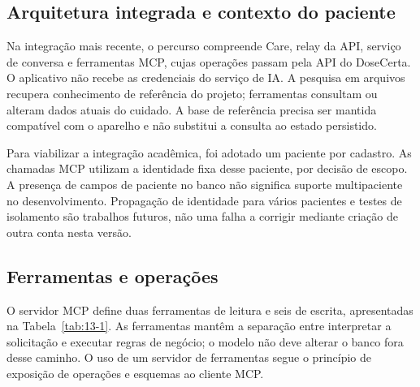 \subsection{Arquitetura integrada e contexto do paciente}
Na integração mais recente, o percurso compreende Care, relay da API, serviço de conversa e ferramentas MCP, cujas operações passam pela API do DoseCerta. O aplicativo não recebe as credenciais do serviço de IA. A pesquisa em arquivos recupera conhecimento de referência do projeto; ferramentas consultam ou alteram dados atuais do cuidado. A base de referência precisa ser mantida compatível com o aparelho e não substitui a consulta ao estado persistido.

Para viabilizar a integração acadêmica, foi adotado um paciente por cadastro. As chamadas MCP utilizam a identidade fixa desse paciente, por decisão de escopo. A presença de campos de paciente no banco não significa suporte multipaciente no desenvolvimento. Propagação de identidade para vários pacientes e testes de isolamento são trabalhos futuros, não uma falha a corrigir mediante criação de outra conta nesta versão.

\subsection{Ferramentas e operações}
O servidor MCP define duas ferramentas de leitura e seis de escrita, apresentadas na Tabela~\ref{tab:13-1}. As ferramentas mantêm a separação entre interpretar a solicitação e executar regras de negócio; o modelo não deve alterar o banco fora desse caminho. O uso de um servidor de ferramentas segue o princípio de exposição de operações e esquemas ao cliente MCP. \cite{MCP_SPEC}

